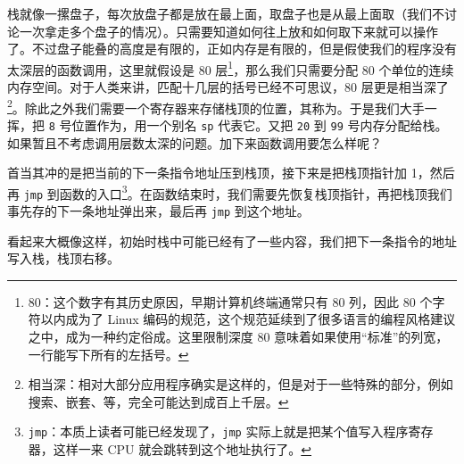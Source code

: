 栈就像一摞盘子，每次放盘子都是放在最上面，取盘子也是从最上面取（我们不讨论一次拿走多个盘子的情况）。只需要知道如何往上放和如何取下来就可以操作了。不过盘子能叠的高度是有限的，正如内存是有限的，但是假使我们的程序没有太深层的函数调用，这里就假设是 80 层\footnote{80：这个数字有其历史原因，早期计算机终端通常只有 80 列，因此 80 个字符以内成为了 Linux 编码的规范，这个规范延续到了很多语言的编程风格建议之中，成为一种约定俗成。这里限制深度 80 意味着如果使用“标准”的列宽，一行能写下所有的左括号。}，那么我们只需要分配 80 个单位的连续内存空间。对于人类来讲，匹配十几层的括号已经不可思议，80 层更是相当深了\footnote{相当深：相对大部分应用程序确实是这样的，但是对于一些特殊的部分，例如搜索、嵌套、等，完全可能达到成百上千层。}。除此之外我们需要一个寄存器来存储栈顶的位置，其称为。于是我们大手一挥，把 \texttt{8} 号位置作为，用一个别名 \texttt{sp} 代表它。又把 \texttt{20} 到 \texttt{99} 号内存分配给栈。如果暂且不考虑调用层数太深的问题。加下来函数调用要怎么样呢？

首当其冲的是把当前的下一条指令地址压到栈顶，接下来是把栈顶指针加 1，然后再 \texttt{jmp} 到函数的入口\footnote{\texttt{jmp}：本质上读者可能已经发现了，\texttt{jmp} 实际上就是把某个值写入程序寄存器，这样一来 CPU 就会跳转到这个地址执行了。}。在函数结束时，我们需要先恢复栈顶指针，再把栈顶我们事先存的下一条地址弹出来，最后再 \texttt{jmp} 到这个地址。

看起来大概像这样，初始时栈中可能已经有了一些内容，我们把下一条指令的地址写入栈，栈顶右移。
\begin{figure}[H]
    \centering
\end{figure}

